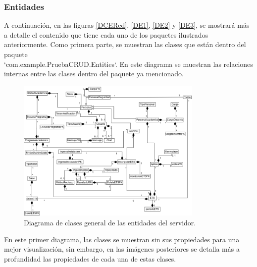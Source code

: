 \subsubsection{Entidades}
A continuación, en las figuras \ref{DCERed}, \ref{DE1}, \ref{DE2} y \ref{DE3}, se mostrará más a detalle el contenido que tiene cada uno de los paquetes ilustrados anteriormente. Como primera parte, se muestran las clases que están dentro del paquete \\ `com.example.PruebaCRUD.Entities`. En este diagrama se muestran las relaciones internas entre las clases dentro del paquete ya mencionado.

\begin{figure}[htbp!]
	\begin{center}
		\includegraphics[width=0.8\textwidth]{Clases/DCE Reducido.png}
		\caption{Diagrama de clases general de las entidades del servidor.}
		\label{fig:DCERed}
	\end{center}
\end{figure}

 En este primer diagrama, las clases se muestran sin sus propiedades para una mejor visualización, sin embargo, en las imágenes posteriores se detalla más a profundidad las propiedades de cada una de estas clases.

\newpage


